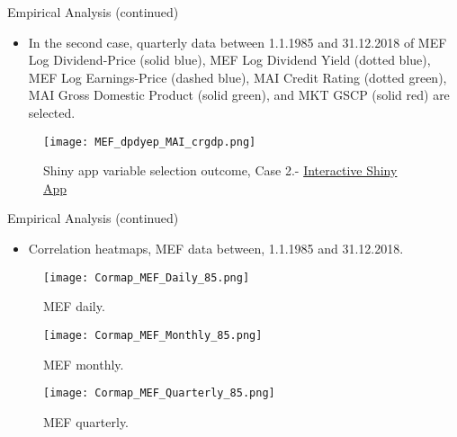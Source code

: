 \documentclass{beamer}
\begin{document}
\begin{frame}{Empirical Analysis (continued)}
  \begin{itemize}
    \item In the second case, quarterly data between 1.1.1985 and 31.12.2018 of MEF Log Dividend-Price (solid blue), MEF Log Dividend Yield (dotted blue), MEF Log Earnings-Price (dashed blue), MAI Credit Rating (dotted green), MAI Gross Domestic Product (solid green), and MKT GSCP (solid red) are selected.
  \end{itemize}
    \begin{figure}[H]
        \centering
        \begin{minipage}{.80\textwidth}
            \centering
            \texttt{[image: MEF\_dpdyep\_MAI\_crgdp.png]}
            \caption{Shiny app variable selection outcome, Case 2.- \href{https://baumender11.shinyapps.io/Alpha/}{Interactive Shiny App}}
            \label{fig:linear_prediction}
        \end{minipage}
    \end{figure}
\end{frame}

\begin{frame}{Empirical Analysis (continued)}
  \begin{itemize}
    \item{ Correlation heatmaps, MEF data between, 1.1.1985 and 31.12.2018.} 
  \end{itemize}

  \begin{figure}[H]
    \centering
    \begin{minipage}{0.32\textwidth}
      \centering
      \texttt{[image: Cormap\_MEF\_Daily\_85.png]}
      \caption{MEF daily.}
      \label{fig:linear_prediction}
    \end{minipage}\hfill
    \begin{minipage}{0.32\textwidth}
      \centering
      \texttt{[image: Cormap\_MEF\_Monthly\_85.png]}
      \caption{MEF monthly.}
      \label{fig:nn_prediction}
    \end{minipage}\hfill
    \begin{minipage}{0.32\textwidth}
      \centering
      \texttt{[image: Cormap\_MEF\_Quarterly\_85.png]} 
      \caption{MEF quarterly.}
      \label{fig:third_prediction}
    \end{minipage}
  \end{figure}
\end{frame}
\end{document}
